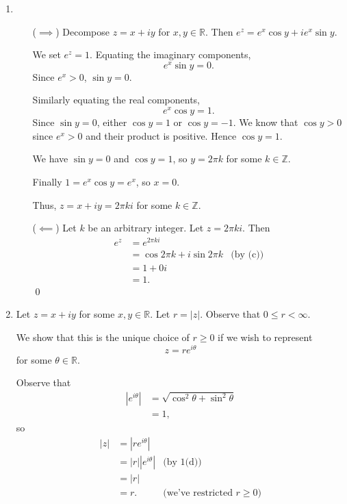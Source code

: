 \documentclass[oneside]{article}
\newcommand\abs[1]{\left|#1\right|}
\newcommand\bbR{\mathbb{R}}
\newcommand\bbZ{\mathbb{Z}}
\begin{document}
\begin{enumerate}[label=\textbf{(\alph*)}]
    \item \begin{itemize}[leftmargin=34pt]
      \item[($\implies$)]
      Decompose $z = x + iy$ for $x, y \in \bbR$. Then
        $e^z = e^x\cos y + ie^x \sin y$.

        We set $e^z = 1$. Equating the imaginary components,\[
          e^x\sin y = 0 \text{.}
        \] Since $e^x > 0$, $\sin y = 0$.

        Similarly equating the real components,\[
          e^x\cos y = 1 \text{.}
        \] Since $\sin y = 0$, either $\cos y = 1$ or $\cos y = -1$. We know
        that $\cos y > 0$ since $e^x > 0$ and their product is positive. Hence
        $\cos y = 1$.

        We have $\sin y = 0$ and $\cos y = 1$, so $y = 2\pi k$ for some
        $k \in \bbZ$.

        Finally $1 = e^x \cos y = e^x$, so $x = 0$.

        Thus, $z = x + iy = 2\pi k i$ for some $k \in \bbZ$.

      \item[($\impliedby$)] Let $k$ be an arbitrary integer. Let $z = 2\pi k i$.
      Then\begin{align*}
        e^z &= e^{2\pi k i} \\
        &= \cos 2\pi k + i\sin 2\pi k &\text{(by (c))} \\
        &= 1 + 0i \\
        &= 1 \text{.}
      \end{align*}\qed
      \end{itemize}

    \item Let $z = x + iy$ for some $x, y \in \bbR$. Let $r = \abs{z}$.
      Observe that $0 \leq r < \infty$.

      We show that this is the unique choice of $r \geq 0$ if we wish to
      represent\[
        z = re^{i\theta}
      \] for some $\theta \in \bbR$.

      Observe that \begin{align*}
        \abs{e^{i\theta}}
        &= \sqrt{\cos^2\theta + \sin^2\theta} \\
        &= 1\text{,}
      \end{align*} so\begin{align*}
        \abs{z} &= \abs{re^{i\theta}} \\
        &= \abs{r}\abs{e^{i\theta}} &\text{(by 1(d))} \\
        &= \abs{r} \\
        &= r\text{.} &\text{(we've restricted $r \geq 0$)}
      \end{align*}


\end{enumerate}
\end{document}
